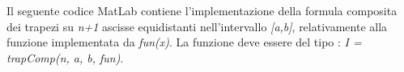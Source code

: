 Il seguente codice MatLab contiene l'implementazione della formula composita dei trapezi su \textit{n+1} ascisse equidistanti nell'intervallo \textit{[a,b]}, relativamente alla funzione implementata da \textit{fun(x)}. La funzione deve essere del tipo : \textit{I = trapComp(n, a, b, fun)}.\\\
